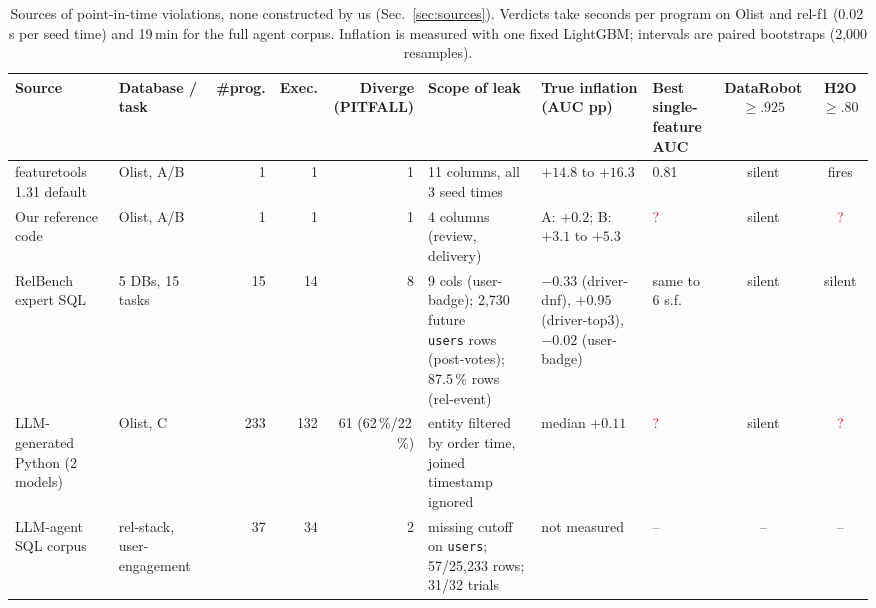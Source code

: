 \newcommand{\todo}[1]{\textcolor{red}{#1}}

\begin{table}[t]
\centering
\caption{Sources of point-in-time violations, none constructed by us (Sec.~\ref{sec:sources}).
Verdicts take seconds per program on Olist and rel-f1 (0.02\,s per seed time) and 19\,min for the full agent corpus.
Inflation is measured with one fixed LightGBM; intervals are paired bootstraps (2{,}000 resamples).}
\label{tab:sources}
\small
\setlength{\tabcolsep}{4pt}
\begin{tabular}{@{}l l r r r l l l c c@{}}
\toprule
Source & Database / task & \#prog. & Exec. & \shortstack[r]{Diverge\\(PITFALL)} & Scope of leak & \shortstack[l]{True inflation\\(AUC pp)} & \shortstack[l]{Best single-\\feature AUC} & \shortstack{DataRobot\\$\ge .925$} & \shortstack{H2O\\$\ge .80$} \\
\midrule
featuretools 1.31 default & Olist, A/B & 1 & 1 & 1 & 11 columns, all 3 seed times & $+14.8$ to $+16.3$ & 0.81 & silent & fires \\
Our reference code & Olist, A/B & 1 & 1 & 1 & 4 columns (review, delivery) & A: $+0.2$; B: $+3.1$ to $+5.3$ & \todo{?} & silent & \todo{?} \\
RelBench expert SQL~\cite{relbench} & 5 DBs, 15 tasks & 15 & 14 & 8 & \shortstack[l]{9 cols (user-badge); 2{,}730 future\\\texttt{users} rows (post-votes); 87.5\,\% rows (rel-event)} & \shortstack[l]{$-0.33$ (driver-dnf), $+0.95$\\(driver-top3), $-0.02$ (user-badge)} & same to 6 s.f. & silent & silent \\
LLM-generated Python (2 models) & Olist, C & 233 & 132 & 61 (62\,\%/22\,\%) & entity filtered by order time, joined timestamp ignored & median $+0.11$ & \todo{?} & silent & \todo{?} \\
LLM-agent SQL corpus & rel-stack, user-engagement & 37 & 34 & 2 & missing cutoff on \texttt{users}; 57/25{,}233 rows; 31/32 trials & not measured & -- & -- & -- \\
\bottomrule
\end{tabular}
\end{table}

